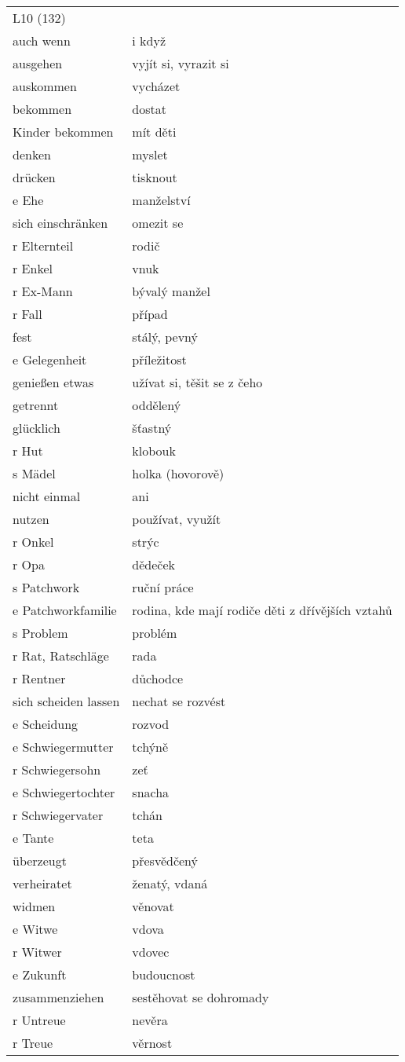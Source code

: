 \documentclass{article}
\begin{document}
\begin{tabular}{ p{5cm}|p{5cm}  }
    \\
    L10 (132) \\
    auch wenn & i když\\
    ausgehen & vyjít si, vyrazit si\\
    auskommen & vycházet\\
    bekommen & dostat\\
    Kinder bekommen & mít děti\\
    denken & myslet\\
    drücken & tisknout\\
    e Ehe & manželství\\
    sich einschränken & omezit se\\
    r Elternteil & rodič\\
    r Enkel & vnuk\\
    r Ex-Mann & bývalý manžel\\
    r Fall & případ\\
    fest & stálý, pevný\\
    e Gelegenheit & příležitost\\
    genie{\ss}en etwas & užívat si, těšit se z čeho\\
    getrennt & oddělený\\
    glücklich & šťastný\\
    r Hut & klobouk\\
    s Mädel & holka (hovorově)\\
    nicht einmal & ani\\
    nutzen & používat, využít\\
    r Onkel & strýc\\
    r Opa & dědeček\\
    s Patchwork & ruční práce\\
    e Patchworkfamilie & rodina, kde mají rodiče děti z dřívějších vztahů\\
    s Problem & problém\\
    r Rat, Ratschläge & rada\\
    r Rentner & důchodce\\
    sich scheiden lassen & nechat se rozvést\\
    e Scheidung & rozvod\\
    e Schwiegermutter & tchýně\\
    r Schwiegersohn & zeť\\
    e Schwiegertochter & snacha\\
    r Schwiegervater & tchán\\
    e Tante & teta\\
    überzeugt & přesvědčený\\
    verheiratet & ženatý, vdaná\\
    widmen & věnovat\\
    e Witwe & vdova\\
    r Witwer & vdovec\\
    e Zukunft & budoucnost\\
    zusammenziehen & sestěhovat se dohromady\\
    r Untreue & nevěra\\
    r Treue & věrnost\\



\end{tabular}
\end{document}
